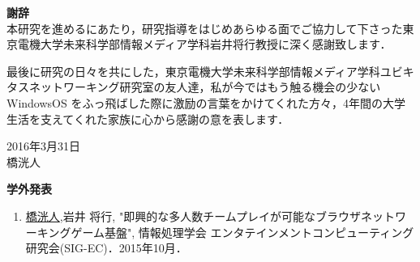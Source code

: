 \newpage
\pagestyle{empty}


\begin{flushleft}
{\huge{\bf 謝辞}}\\
\vspace{1cm}
本研究を進めるにあたり，研究指導をはじめあらゆる面でご協力して下さった東京電機大学未来科学部情報メディア学科岩井将行教授に深く感謝致します．
\par
最後に研究の日々を共にした，東京電機大学未来科学部情報メディア学科ユビキタスネットワーキング研究室の友人達，私が今ではもう触る機会の少ない WindowsOS をふっ飛ばした際に激励の言葉をかけてくれた方々，4年間の大学生活を支えてくれた家族に心から感謝の意を表します．\\

\vspace{3cm}
\begin{flushright}
2016年3月31日\\
橋洸人\\
\end{flushright}
\end{flushleft}



\newpage




\begin{flushleft}
{\huge{\bf 学外発表}}\\
\vspace{1cm}
\begin{enumerate}
	
\item \underline{橋洸人},岩井 将行, "即興的な多人数チームプレイが可能なブラウザネットワーキングゲーム基盤", 情報処理学会 エンタテインメントコンピューティング研究会(SIG-EC)．2015年10月．

\end{enumerate}
\end{flushleft}

\newpage

\renewcommand{\bibname}{参考文献}

